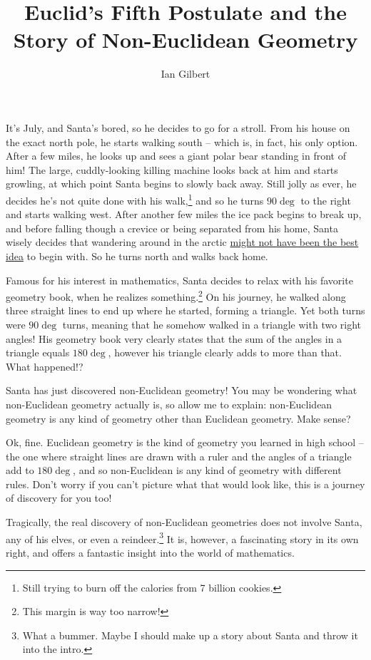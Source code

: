 \documentclass[12pt]{article}
\title{Euclid's Fifth Postulate and the Story of Non-Euclidean Geometry}
\author{Ian Gilbert}
\date{}
\begin{document}
\maketitle
\thispagestyle{empty}

It's July, and Santa's bored, so he decides to go for a stroll. From his house on the exact north pole, he starts walking south -- which is, in fact, his only option. After a few miles, he looks up and sees a giant polar bear standing in front of him! The large, cuddly-looking killing machine looks back at him and starts growling, at which point Santa begins to slowly back away. Still jolly as ever, he decides he's not quite done with his walk,\footnote{Still trying to burn off the calories from 7 billion cookies.} and so he turns $90\deg$ to the right and starts walking west. After another few miles the ice pack begins to break up, and before falling though a crevice or being separated from his home, Santa wisely decides that wandering around in the arctic \href{https://www.quora.com/What-are-the-main-dangers-when-trying-to-reach-the-north-pole}{might not have been the best idea} to begin with. So he turns north and walks back home.

Famous for his interest in mathematics,\lol{} Santa decides to relax with his favorite geometry book, when he realizes something.\footnote{This margin is way too narrow!} On his journey, he walked along three straight lines to end up where he started, forming a triangle. Yet both turns were $90\deg$ turns, meaning that he somehow walked in a triangle with two right angles! His geometry book very clearly states that the sum of the angles in a triangle equals $180\deg$, however his triangle clearly adds to more than that. What happened!?

Santa has just discovered non-Euclidean geometry! You may be wondering what non-Euclidean geometry actually is, so allow me to explain: non-Euclidean geometry is any kind of geometry other than Euclidean geometry. Make sense?

Ok, fine. Euclidean geometry is the kind of geometry you learned in high school -- the one where straight lines are drawn with a ruler and the angles of a triangle add to $180\deg$, and so non-Euclidean is any kind of geometry with different rules. Don't worry if you can't picture what that would look like, this is a journey of discovery for you too!

Tragically, the real discovery of non-Euclidean geometries does not involve Santa, any of his elves, or even a reindeer.\footnote{What a bummer. Maybe I should make up a story about Santa and throw it into the intro.} It is, however, a fascinating story in its own right, and offers a fantastic insight into the world of mathematics.
\end{document}
